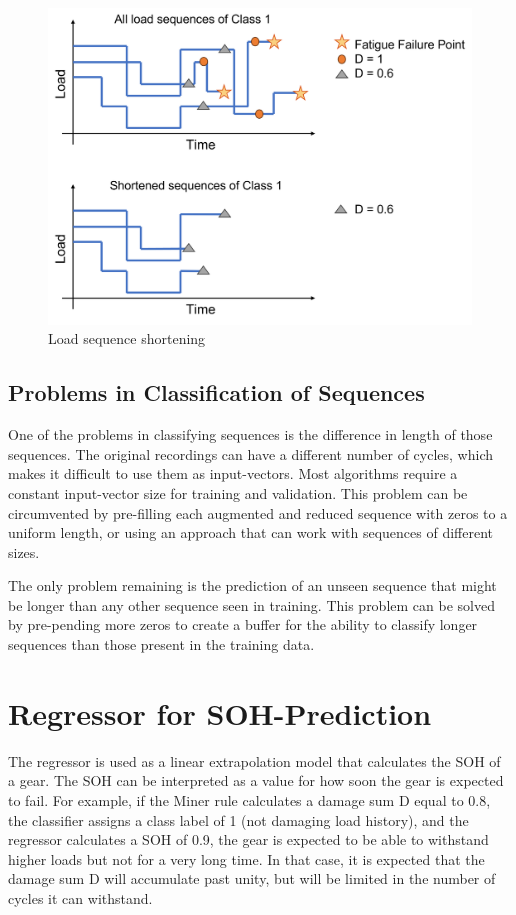 \begin{figure}[H]
	\centering
	\includegraphics[width=0.8\linewidth]{IMGs/Shortened.png}
	\caption{Load sequence shortening}
	\label{fig:Shortened}
\end{figure}

\subsection{Problems in Classification of Sequences}
One of the problems in classifying sequences is the difference in length of those sequences. The original recordings can have a different number of cycles, which makes it difficult to use them as input-vectors. Most algorithms require a constant input-vector size for training and validation. This problem can be circumvented by pre-filling each augmented and reduced sequence with zeros to a uniform length, or using an approach that can work with sequences of different sizes. 


The only problem remaining is the prediction of an unseen sequence that might be longer than any other sequence seen in training.
This problem can be solved by pre-pending more zeros to create a buffer for the ability to classify longer sequences than those present in the training data.



\section{Regressor for SOH-Prediction}
The regressor is used as a linear extrapolation model that calculates the SOH of a gear. The SOH can be interpreted as a value for how soon the gear is expected to fail. For example, if the Miner rule calculates a damage sum D equal to 0.8, the classifier assigns a class label of 1 (not damaging load history), and the regressor calculates a SOH of 0.9, the gear is expected to be able to withstand higher loads but not for a very long time. In that case, it is expected that the damage sum D will accumulate past unity, but will be limited in the number of cycles it can withstand. 

